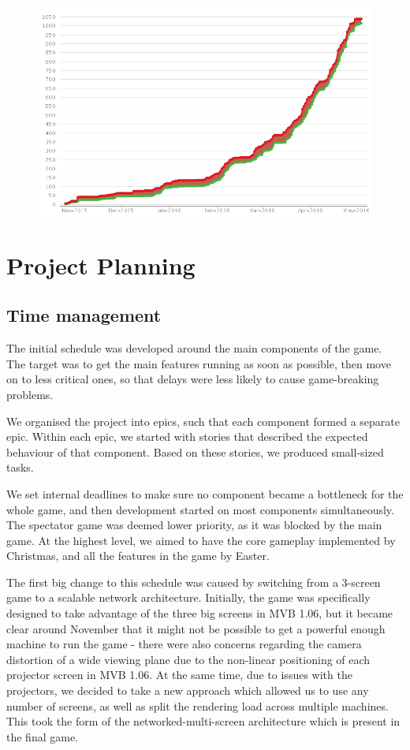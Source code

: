 \documentclass[a4paper,11pt]{article}
\begin{document}
\begin{figure}[ht]
	\centering
    \includegraphics[width=.75\textwidth]{jira_open_vs_closed}
\end{figure}

\section{Project Planning}

\subsection{Time management}
The initial schedule was developed around the main components of the game. The target was to get the main features running as soon as possible, then move on to less critical ones, so that delays were less likely to cause game-breaking problems.

We organised the project into epics, such that each component formed a separate epic. Within each epic, we started with stories that described the expected behaviour of that component. Based on these stories, we produced small-sized tasks.

We set internal deadlines to make sure no component became a bottleneck for the whole game, and then development started on most components simultaneously. The spectator game was deemed lower priority, as it was blocked by the main game. At the highest level, we aimed to have the core gameplay implemented by Christmas, and all the features in the game by Easter.

The first big change to this schedule was caused by switching from a 3-screen game to a scalable network architecture. Initially, the game was specifically designed to take advantage of the three big screens in MVB 1.06, but it became clear around November that it might not be possible to get a powerful enough machine to run the game - there were also concerns regarding the camera distortion of a wide viewing plane due to the non-linear positioning of each projector screen in MVB 1.06. At the same time, due to issues with the projectors, we decided to take a new approach which allowed us to use any number of screens, as well as split the rendering load across multiple machines. This took the form of the networked-multi-screen architecture which is present in the final game.
\end{document}
